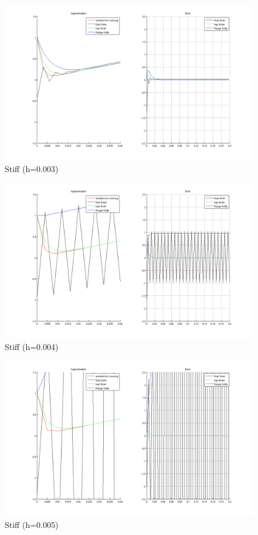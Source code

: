 \documentclass[10pt]{scrartcl}
\begin{document}
	
	\begin{figure}[H]
			\centering	
			\includegraphics[width=\textwidth]{stiff0003.png}
            \caption{Stiff (h=0.003)}
            \label{pic:stuff003}
		\end{figure} 
	
	
	\begin{figure}[H]
			\centering	
			\includegraphics[width=\textwidth]{stiff0004.png}
            \caption{Stiff (h=0.004)}
            \label{pic:stuff004}
		\end{figure} 
	
	\begin{figure}[H]
			\centering	
			\includegraphics[width=\textwidth]{stiff0005.png}
            \caption{Stiff (h=0.005)}
            \label{pic:stuff005}
		\end{figure} 
\end{document}

